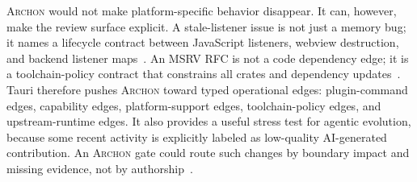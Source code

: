 \documentclass[sigconf,review,anonymous]{acmart}
\theoremstyle{plain}
\theoremstyle{definition}
\begin{document}
\textsc{Archon} would not make platform-specific behavior disappear. It can,
however, make the review surface explicit. A stale-listener issue is not just a
memory bug; it names a lifecycle contract between JavaScript listeners, webview
destruction, and backend listener maps~\cite{taurieventlisteners}. An MSRV RFC
is not a code dependency edge; it is a toolchain-policy contract that constrains
all crates and dependency updates~\cite{taurimsrv}. Tauri therefore pushes
\textsc{Archon} toward typed operational edges: plugin-command edges,
capability edges, platform-support edges, toolchain-policy edges, and
upstream-runtime edges. It also provides a useful stress test for agentic
evolution, because some recent activity is explicitly labeled as low-quality
AI-generated contribution. An \textsc{Archon} gate could route such changes by
boundary impact and missing evidence, not by authorship~\cite{tauriaislop}.



\end{document}
